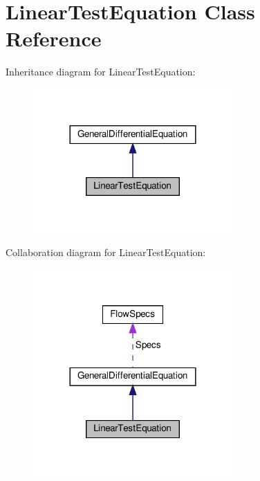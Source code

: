 \hypertarget{classLinearTestEquation}{}\section{Linear\+Test\+Equation Class Reference}
\label{classLinearTestEquation}


Inheritance diagram for Linear\+Test\+Equation\+:
\nopagebreak
\begin{figure}[H]
\begin{center}
\leavevmode
\includegraphics[width=216pt]{classLinearTestEquation__inherit__graph}
\end{center}
\end{figure}


Collaboration diagram for Linear\+Test\+Equation\+:
\nopagebreak
\begin{figure}[H]
\begin{center}
\leavevmode
\includegraphics[width=216pt]{classLinearTestEquation__coll__graph}
\end{center}
\end{figure}
